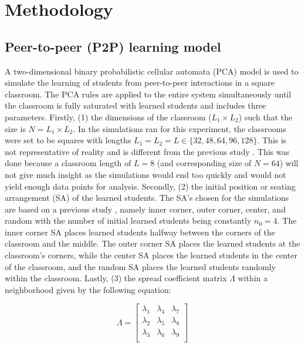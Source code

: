 \documentclass[10pt,a4paper,twoside]{article}
\begin{document}
\section{Methodology}\label{sec:methods}
\subsection{Peer-to-peer (P2P) learning model}
A two-dimensional binary probabilistic cellular automata (PCA) model is used to simulate the learning of students from peer-to-peer interactions in a square classroom. The PCA rules are applied to the entire system simultaneously until the classroom is fully saturated with learned students and includes three parameters. Firstly, (1) the dimensions of the classroom ($L_1 \times L_2$) such that the size is $N=L_1 \times L_2$. In the simulations ran for this experiment, the classrooms were set to be squares with lengths $L_1 = L_2 = L \in \lbrace 32,48,64,96,128\rbrace$. This is not representative of reality and is different from the previous study \cite{roxas2010seating}. This was done because a classroom length of $L=8$ (and corresponding size of $N=64$) will not give much insight as the simulations would end too quickly and would not yield enough data points for analysis. Secondly, (2) the initial position or seating arrangement (SA) of the learned students. The SA's chosen for the simulations are based on a previous study \cite{roxas2010seating}, namely inner corner, outer corner, center, and random with the number of initial learned students being constantly $n_0 = 4$. The inner corner SA places learned students halfway between the corners of the classroom and the middle. The outer corner SA places the learned students at the classroom's corners, while the center SA places the learned students in the center of the classroom, and the random SA places the learned students randomly within the classroom. Lastly, (3) the spread coefficient matrix $\Lambda$ within a neighborhood given by the following equation:

\begin{equation}\label{eq:Lambda matrix}
  \Lambda = 
  \begin{bmatrix}
  \lambda_1 & \lambda_4 & \lambda_7\\
  \lambda_2 & \lambda_5 & \lambda_8\\
  \lambda_3 & \lambda_6 & \lambda_9\\
  \end{bmatrix}%
\end{equation}
\end{document}
